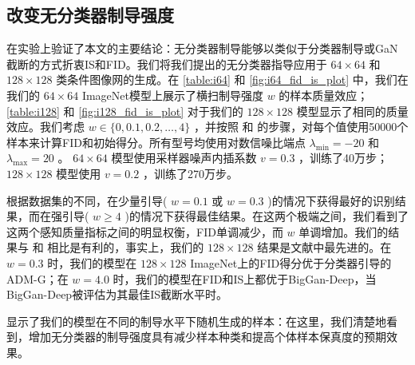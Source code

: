 \documentclass{article}
\begin{document}
 \subsection{
改变无分类器制导强度} 在实验上验证了本文的主要结论：无分类器制导能够以类似于分类器制导或GaN截断的方式折衷IS和FID。我们将我们提出的无分类器指导应用于 $64\times64$ 和 $128\times128$ 类条件图像网的生成。在 \cref{table:i64} 和 \cref{fig:i64_fid_is_plot} 中，我们在我们的 $64\times64$ ImageNet模型上展示了横扫制导强度 $w$ 的样本质量效应； \cref{table:i128} 和 \cref{fig:i128_fid_is_plot} 对于我们的 $128\times128$ 模型显示了相同的质量效应。我们考虑 $w \in  \{ 0, 0.1, 0.2, \ldots, 4 \} $ ，并按照 \citet{heusel2017gans} 和 \citet{salimans2016improved} 的步骤，对每个值使用50000个样本来计算FID和初始得分。所有型号均使用对数信噪比端点 $\lambda_\mathrm{min}=-20$ 和 $\lambda_\mathrm{max}=20$ 。 $64\times64$ 模型使用采样器噪声内插系数 $v=0.3$ ，训练了40万步； $128\times128$ 模型使用 $v=0.2$ ，训练了270万步。


根据数据集的不同，在少量引导( $w = 0.1$ 或 $w=0.3$ )的情况下获得最好的识别结果，而在强引导( $w \geq 4$ )的情况下获得最佳结果。在这两个极端之间，我们看到了这两个感知质量指标之间的明显权衡，FID单调减少，而 $w$ 单调增加。我们的结果与 \citet{dhariwal2021diffusion} 和 \citet{ho2021cascaded} 相比是有利的，事实上，我们的 $128\times128$ 结果是文献中最先进的。在 $w=0.3$ 时，我们的模型在 $128\times128$ ImageNet上的FID得分优于分类器引导的ADM-G；在 $w=4.0$ 时，我们的模型在FID和IS上都优于BigGan-Deep，当BigGan-Deep被评估为其最佳IS截断水平时。


  显示了我们的模型在不同的制导水平下随机生成的样本：在这里，我们清楚地看到，增加无分类器的制导强度具有减少样本种类和提高个体样本保真度的预期效果。
\end{document}
